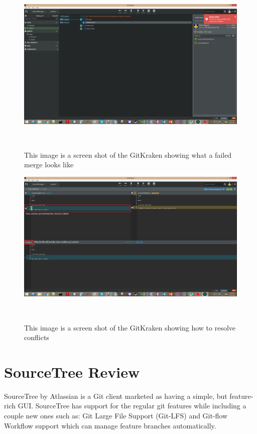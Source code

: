 \documentclass{sigchi}
\begin{document}
\begin{figure}
  \centering
  \includegraphics[width=1.75\columnwidth]{figures/GitKraken/MergeFailedNotification}
  \caption{This image is a screen shot of the GitKraken showing what a failed merge looks like}~\label{fig:GitKrakenFigure5}
\end{figure}

\begin{figure}
  \centering
  \includegraphics[width=1.75\columnwidth]{figures/GitKraken/MergeConflictResolution}
  \caption{This image is a screen shot of the GitKraken showing how to resolve conflicts}~\label{fig:GitKrakenFigure6}
\end{figure}

\section{SourceTree Review}
SourceTree by Atlassian is a Git client marketed as having a simple, but 
feature-rich GUI. SourceTree has support for the regular git features while 
including a couple new ones such as: Git Large File Support (Git-LFS) and 
Git-flow Workflow support which can manage feature branches automatically. 
\end{document}
